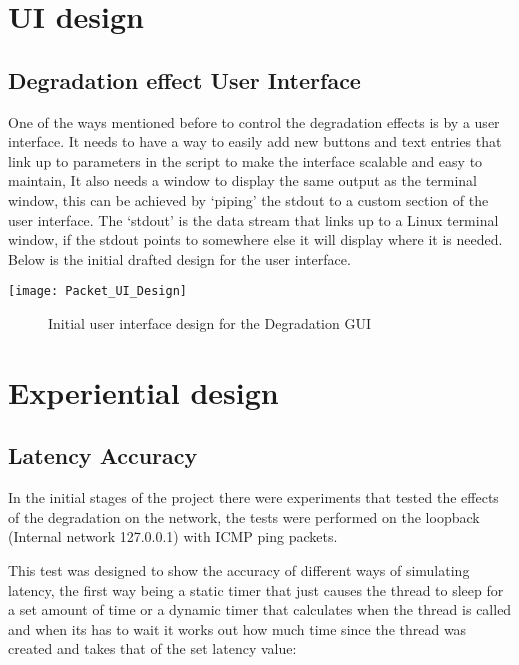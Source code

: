 \section{UI design}
\subsection{Degradation effect User Interface}
One of the ways mentioned before to control the degradation effects is by a user interface. It needs to have a way to easily add new buttons and text entries that link up to parameters in the script to make the interface scalable and easy to maintain, It also needs a window to display the same output as the terminal window, this can be achieved by `piping' the stdout to a custom section of the user interface. The `stdout' is the data stream that links up to a Linux terminal window, if the stdout points to somewhere else it will display where it is needed. Below is the initial drafted design for the user interface.

\begin{center}
	\texttt{[image: Packet\_UI\_Design]}
	\begin{figure}[h]
		\caption{Initial user interface design for the Degradation GUI}
	\end{figure}
\end{center}


\section{Experiential design}
\subsection{Latency Accuracy}
In the initial stages of the project there were experiments that tested the effects of the degradation on the network, the tests were performed on the loopback (Internal network 127.0.0.1) with ICMP ping packets.

This test was designed to show the accuracy of different ways of simulating latency, the first way being a static timer that just causes the thread to sleep for a set amount of time or a dynamic timer that calculates when the thread is called and when its has to wait it works out how much time since the thread was created and takes that of the set latency value:

